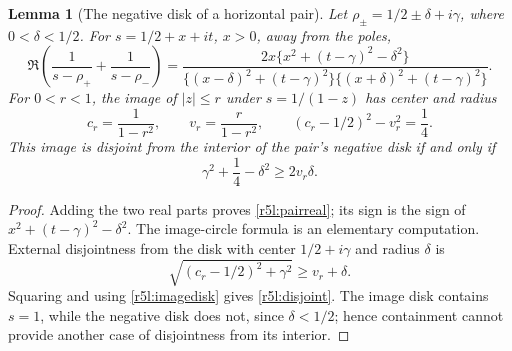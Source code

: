 \documentclass[11pt,a4paper]{article}
\newtheorem{lemma}[theorem]{Lemma}
\theoremstyle{definition}\newtheorem{definition}[theorem]{Definition}
\theoremstyle{remark}\newtheorem{remark}[theorem]{Remark}
\numberwithin{equation}{section}
\begin{document}
\begin{lemma}[The negative disk of a horizontal pair]
\label{r5l:pairgeometry}
Let $\rho_\pm=1/2\pm\delta+i\gamma$, where $0<\delta<1/2$.
For $s=1/2+x+it$, $x>0$, away from the poles,
\begin{equation}\label{r5l:pairreal}
 \Re\left(\frac1{s-\rho_+}+\frac1{s-\rho_-}\right)
 =\frac{2x\{x^2+(t-\gamma)^2-\delta^2\}}
 {\{(x-\delta)^2+(t-\gamma)^2\}
  \{(x+\delta)^2+(t-\gamma)^2\}}.
\end{equation}
For $0<r<1$, the image of $|z|\le r$ under $s=1/(1-z)$
has center and radius
\begin{equation}\label{r5l:imagedisk}
 c_r=\frac1{1-r^2},\qquad v_r=\frac r{1-r^2},
 \qquad(c_r-1/2)^2-v_r^2=\frac14.
\end{equation}
This image is disjoint from the interior of the pair's negative
disk if and only if
\begin{equation}\label{r5l:disjoint}
 \gamma^2+\frac14-\delta^2\ge2v_r\delta.
\end{equation}
\end{lemma}
\begin{proof}
Adding the two real parts proves \eqref{r5l:pairreal}; its sign is
the sign of $x^2+(t-\gamma)^2-\delta^2$.  The image-circle formula
is an elementary computation.  External disjointness from the disk
with center $1/2+i\gamma$ and radius $\delta$ is
\[
 \sqrt{(c_r-1/2)^2+\gamma^2}\ge v_r+\delta.
\]
Squaring and using \eqref{r5l:imagedisk} gives
\eqref{r5l:disjoint}.  The image disk contains $s=1$, while the
negative disk does not, since $\delta<1/2$; hence containment cannot
provide another case of disjointness from its interior.
\end{proof}
\end{document}
